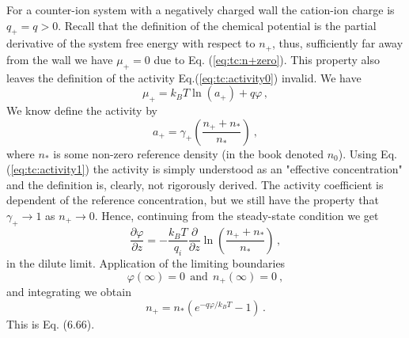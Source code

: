 \documentclass[11pt]{article}
\begin{document}
For a counter-ion system with a negatively charged wall the cation-ion charge is  $q_+ = q > 0$. Recall 
that the definition of the chemical potential is the partial derivative of the system free energy 
with respect to $n_+$, thus, sufficiently far away from the wall we have $\mu_+ = 0$ due to  Eq. (\ref{eq:tc:n+zero}). 
This property also leaves the definition of the activity Eq.(\ref{eq:tc:activity0}) invalid. We have 
\begin{equation}
	\mu_+ = k_BT \ln(a_+) + q\varphi \, ,
\end{equation}
We know define the activity by
\begin{equation}
	\label{eq:tc:activity1}
	a_+ = \gamma_+ \left(\frac{n_+ + n_*}{n_*} \right)\ ,
\end{equation}
where $n_*$ is some non-zero reference density (in the book denoted $n_0$). Using Eq. 
(\ref{eq:tc:activity1}) the activity is simply understood as an "effective 
concentration" and the definition is, clearly, not rigorously derived. The activity coefficient is 
dependent of the reference concentration, but we still have the property that 
$\gamma_+ \rightarrow 1$ as $n_+ \rightarrow 0$. Hence, continuing from the steady-state condition we get 
\begin{equation}
	\frac{\partial \varphi}{\partial z} = -\frac{k_BT}{q_i}\frac{\partial}{\partial z} \ln 
	\left( \frac{n_+ + n_*}{n_*} \right) \, ,
\end{equation}	
in the dilute limit. Application of the limiting boundaries 
\begin{equation}
	\varphi(\infty) = 0 \ \ \text{and} \ \ n_+(\infty) = 0 \ ,
\end{equation}
and integrating we obtain
\begin{equation}
	n_+ = n_*(e^{-q\varphi/k_BT} -1) \, .
\end{equation}
This is Eq. (6.66). 
\end{document}
